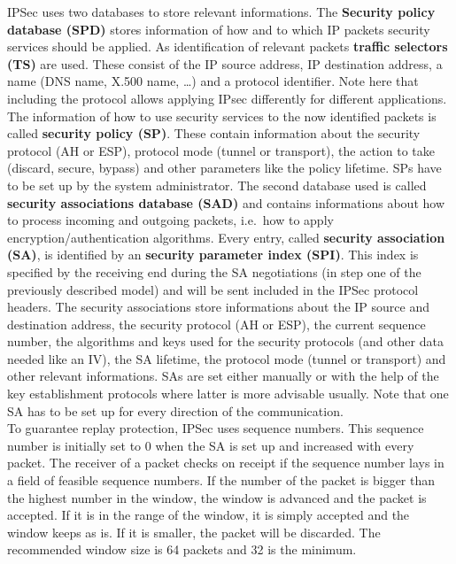 IPSec uses two databases to store relevant informations.
The \textbf{Security policy database (SPD)} stores information of how and to which IP packets security services should be applied.
As identification of relevant packets \textbf{traffic selectors (TS)} are used.
These consist of the IP source address, IP destination address, a name (DNS name, X.500 name, \dots) and a protocol identifier.
Note here that including the protocol allows applying IPsec differently for different applications.
The information of how to use security services to the now identified packets is called \textbf{security policy (SP)}.
These contain information about the security protocol (AH or ESP), protocol mode (tunnel or transport), the action to take (discard, secure, bypass) and other parameters like the policy lifetime.
SPs have to be set up by the system administrator.
The second database used is called \textbf{security associations database (SAD)} and contains informations about how to process incoming and outgoing packets, i.e.\ how to apply encryption/authentication algorithms.
Every entry, called \textbf{security association (SA)}, is identified by an \textbf{security parameter index (SPI)}.
This index is specified by the receiving end during the SA negotiations (in step one of the previously described model) and will be sent included in the IPSec protocol headers.
The security associations store informations about the IP source and destination address, the security protocol (AH or ESP), the current sequence number, the algorithms and keys used for the security protocols (and other data needed like an IV), the SA lifetime, the protocol mode (tunnel or transport) and other relevant informations.
SAs are set either manually or with the help of the key establishment protocols where latter is more advisable usually.
Note that one SA has to be set up for every direction of the communication.\\

To guarantee replay protection, IPSec uses sequence numbers.
This sequence number is initially set to 0 when the SA is set up and increased with every packet.
The receiver of a packet checks on receipt if the sequence number lays in a field of feasible sequence numbers.
If the number of the packet is bigger than the highest number in the window, the window is advanced and the packet is accepted.
If it is in the range of the window, it is simply accepted and the window keeps as is.
If it is smaller, the packet will be discarded.
The recommended window size is 64 packets and 32 is the minimum.

